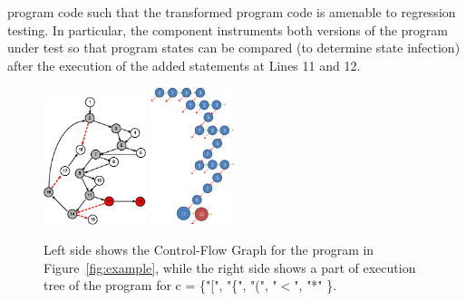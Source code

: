 program code such that the transformed program code is
amenable to regression testing. In particular, the  component
instruments both versions of the program under test so that program states can be compared (to determine state infection) after the execution of the added  statements at Lines 11 and 12.
	\begin{figure}[t]
    \centering
        \includegraphics[width=3cm, keepaspectratio]{Figures/exampleCFG}
        \includegraphics[height=4cm, keepaspectratio]{Figures/Presentation2}
    \caption{\scriptsize{Left side shows the Control-Flow Graph for the program in Figure~\ref{fig:example}, while the right side shows a part of execution tree of the program for c = \{"[", "\{", "(", "$<$", "*" \}.}}
    \label{fig:CFG}
    
\end{figure}
